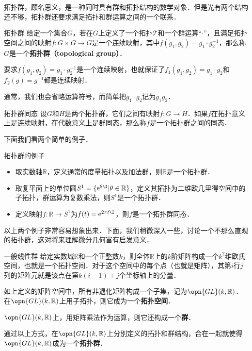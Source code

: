 


拓扑群，顾名思义，是一种同时具有群和拓扑结构的数学对象．但是光有两个结构还不够，拓扑群还要求满足拓扑和群运算之间的一个联系．

\begin{definition}{拓扑群}
给定一个集合$G$，若在$G$上定义了一个拓扑$\mathcal{T}$和一个群运算“$\cdot$”，且满足拓扑空间之间的映射$f:G\times G\rightarrow G$是一个连续映射，其中$f(g_1, g_2)=g_1\cdot g_2^{-1}$，那么称$G$是一个\textbf{拓扑群（topological group）}．
\end{definition}

要求$f(g_1, g_2)=g_1\cdot g_2^{-1}$是一个连续映射，也就保证了$f_1(g_1, g_2)=g_1\cdot g_2$和$f_2(g)=g^{-1}$都是连续映射．

通常，我们也会省略运算符号，而简单把$g_1\cdot g_2$记为$g_1g_2$．

\begin{definition}{拓扑群同态}
设$G$和$H$是两个拓扑群，它们之间有映射$f:G\rightarrow H$．如果$f$在拓扑意义上是连续映射，在代数意义上是群同态，那么称$f$是一个拓扑群之间的同态．
\end{definition}

下面我们看两个简单的例子．

\begin{example}{拓扑群的例子}\label{TopGrp_ex1}
\begin{itemize}
\item 取实数轴$\mathbb{R}$，定义通常的度量拓扑以及加法群，则$\mathbb{R}$是一个拓扑群．
\item 取复平面上的单位圆$S^1=\{\mathrm{e}^{\theta\I}|\theta\in\mathbb{R}\}$，定义其拓扑为二维欧几里得空间中的子拓扑，群运算为复数乘法，则$S^1$是一个拓扑群．
\item 定义映射$f:\mathbb{R}\rightarrow S^1$为$f(t)=\mathrm{e}^{2\pi t\I}$，则$f$是一个拓扑群同态．
\end{itemize}
\end{example}

以上两个例子非常容易想象出来．下面，我们稍微深入一些，讨论一个不那么直观的拓扑群，这对将来理解微分几何富有启发意义．

\begin{example}{一般线性群}\label{TopGrp_ex2}
给定实数域$\mathbb{R}$和一个正整数$k$，则全体$\mathbb{R}$上的$k$阶矩阵构成一个$k^2$维欧氏空间，也就是一个拓扑空间．对于这个空间中的每个点（也就是矩阵），其第$i$行$j$列的矩阵元就是该点在第$k(i-1)+j$个坐标轴上的分量．

如上定义的矩阵空间中，所有非退化矩阵构成一个子集，记为$\opn{GL}(k, \mathbb{R})$．在$\opn{GL}(k,\mathbb{R})$上用子拓扑，则它成为一个\textbf{拓扑空间}．

$\opn{GL}(k,\mathbb{R})$上，用矩阵乘法作为运算，则它还构成一个\textbf{群}．

通过以上方式，在$\opn{GL}(k, \mathbb{R})$上分别定义的拓扑和群结构，合在一起就使得$\opn{GL}(k, \mathbb{R})$成为一个\textbf{拓扑群}．
\end{example}


